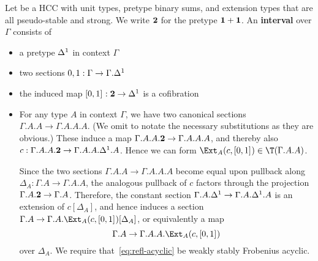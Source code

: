 \documentclass{amsart}
\begin{document}
\begin{defn}
  Let \E be a HCC with unit types, pretype binary sums, and extension types that are all pseudo-stable and strong.
  We write $\mathbf{2}$ for the pretype $\mathbf{1}+\mathbf{1}$.
  An \textbf{interval} over $\Gamma$ consists of
  \begin{itemize}
  \item a pretype ${\Delta^1}$ in context $\Gamma$
  \item two sections $0,1: \Gamma \to \Gamma.{\Delta^1}$
  \item the induced map $\left[ 0,1\right]_{} : \mathbf{2} \to {\Delta^1}$ is a cofibration
  \item For any type $A$ in context $\Gamma$, we have two canonical sections $\Gamma.A.A \to \Gamma.A.A.A$.
    (We omit to notate the necessary substitutions as they are obvious.)
    These induce a map $\Gamma.A.A.\mathbf{2} \to \Gamma.A.A.A$, and thereby also $c:\Gamma.A.A.\mathbf{2} \to \Gamma.A.A.{\Delta^1}.A$.
    Hence we can form $\Ext_A(c,\copair{0}{1}) \in \T(\Gamma.A.A)$.

    Since the two sections $\Gamma.A.A \to \Gamma.A.A.A$ become equal upon pullback along $\Delta_A : \Gamma.A \to \Gamma.A.A$, the analogous pullback of $c$ factors through the projection $\Gamma.A.\mathbf{2} \to \Gamma.A$.
    Therefore, the constant section $\Gamma.A.{\Delta^1} \to \Gamma.A.{\Delta^1}.A$ is an extension of $c[\Delta_A]$, and hence induces a section $\Gamma.A \to \Gamma.A.\Ext_A(c,\copair{0}{1})[\Delta_A]$, or equivalently a map
    \begin{equation}
      \Gamma.A \to \Gamma.A.A.\Ext_A(c,\copair{0}{1})\label{eq:refl-acyclic}
    \end{equation}
    over $\Delta_A$.
    We require that~\eqref{eq:refl-acyclic} be weakly stably Frobenius acyclic.
  \end{itemize}
\end{defn}
\end{document}

